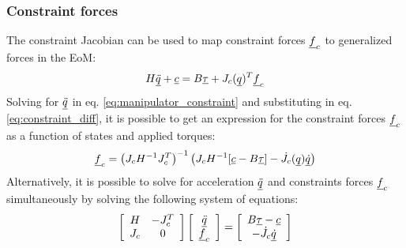 \subsubsection{Constraint forces}
\label{sec:constraint_forces}

The constraint Jacobian can be used to map constraint forces $\underline{f}_c$ to generalized forces in the EoM:
%
\begin{align}
	H \underline{\ddot{q}} + \underline{c} = B \underline{\tau} + J_c( \underline{ q } )^T  \underline{f}_c
	\label{eq:manipulator_constraint}
\end{align}
%
Solving for $\underline{\ddot{q}}$ in eq. \eqref{eq:manipulator_constraint} and substituting in eq. \eqref{eq:constraint_diff}, it is possible to get an expression for the constraint forces $\underline{f}_c$ as a function of states and applied torques:
%
\begin{align}
	\underline{f}_c = \left( J_c H^{-1} J_c^T \right)^{-1} \left(  J_c H^{-1} [\underline{c} - B \underline{\tau} ] - \dot{J}_c( \underline{ q } ) \underline{\dot{q}}   \right)
	\label{eq:const_forces}
\end{align}
%
Alternatively, it is possible to solve for acceleration $\underline{\ddot{q}}$ and constraints forces $\underline{f}_c$ simultaneously by solving the following system of equations:
%
\begin{align}
	\left[ \begin{array}{c c }     H & -J_c^T  \\ J_c     & 0    \end{array} \right] \left[ \begin{array}{c} \underline{\ddot{q}}  \\ \underline{f}_c \end{array} \right] = \left[ \begin{array}{c}  B \underline{\tau} - \underline{c}   \\ -\dot{J}_c \underline{\dot{q}}  \end{array} \right]
	\label{eq:manipulator_constraint_eom}
\end{align}


